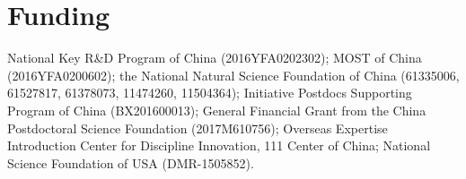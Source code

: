 \documentclass{osa-article}
\begin{document}
\section*{Funding}

National Key R\&D Program of China
(2016YFA0202302); MOST of China (2016YFA0200602); the National Natural Science Foundation of China (61335006, 61527817, 61378073, 11474260, 11504364); Initiative Postdocs Supporting Program of China (BX201600013); General Financial Grant from the China Postdoctoral Science Foundation (2017M610756); Overseas Expertise Introduction Center for Discipline Innovation, 111 Center of China; National Science Foundation of USA (DMR-1505852).
\end{document}
